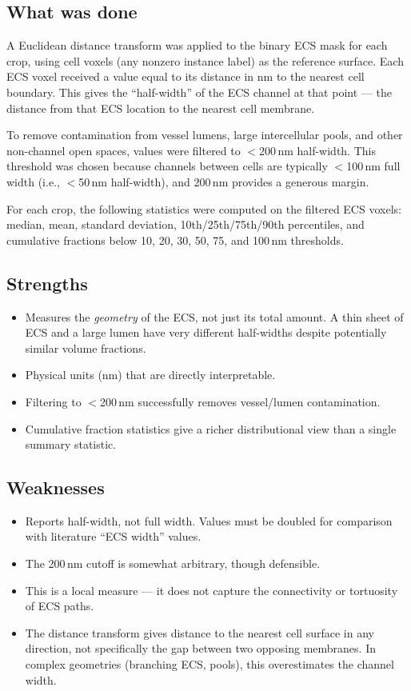 \documentclass[times, twoside]{zHenriquesLab-StyleBioRxiv}
\begin{document}
\subsection*{What was done}
A Euclidean distance transform was applied to the binary ECS mask for each crop, using cell voxels (any nonzero instance label) as the reference surface. Each ECS voxel received a value equal to its distance in nm to the nearest cell boundary. This gives the ``half-width'' of the ECS channel at that point --- the distance from that ECS location to the nearest cell membrane.

To remove contamination from vessel lumens, large intercellular pools, and other non-channel open spaces, values were filtered to $<$200\,nm half-width. This threshold was chosen because channels between cells are typically $<$100\,nm full width (i.e., $<$50\,nm half-width), and 200\,nm provides a generous margin.

For each crop, the following statistics were computed on the filtered ECS voxels: median, mean, standard deviation, 10th/25th/75th/90th percentiles, and cumulative fractions below 10, 20, 30, 50, 75, and 100\,nm thresholds.

\subsection*{Strengths}
\begin{itemize}[nosep]
\item Measures the \textit{geometry} of the ECS, not just its total amount. A thin sheet of ECS and a large lumen have very different half-widths despite potentially similar volume fractions.
\item Physical units (nm) that are directly interpretable.
\item Filtering to $<$200\,nm successfully removes vessel/lumen contamination.
\item Cumulative fraction statistics give a richer distributional view than a single summary statistic.
\end{itemize}

\subsection*{Weaknesses}
\begin{itemize}[nosep]
\item Reports half-width, not full width. Values must be doubled for comparison with literature ``ECS width'' values.
\item The 200\,nm cutoff is somewhat arbitrary, though defensible.
\item This is a local measure --- it does not capture the connectivity or tortuosity of ECS paths.
\item The distance transform gives distance to the nearest cell surface in any direction, not specifically the gap between two opposing membranes. In complex geometries (branching ECS, pools), this overestimates the channel width.
\end{itemize}
\end{document}
